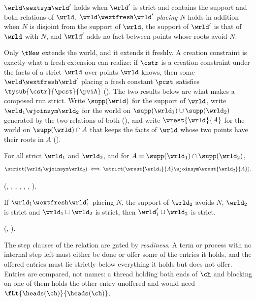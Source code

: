\begin{definition}
\label{def:wext}
  $\wrld \wextsym \wrld'$ holds when $\wrld'$ is strict and contains the
  support and both relations of $\wrld$.
  $\wrld \wextfresh \wrld'$ \emph{placing $N$} holds in addition when
  $N$ is disjoint from the support of $\wrld$, the support of $\wrld'$
  is that of $\wrld$ with $N$, and $\wrld'$ adds no fact between points
  whose roots avoid $N$.
\end{definition}

Only $\tNew$ extends the world, and it extends it freshly. A creation
constraint is exactly what a fresh extension can realize: if $\cstr$ is a
creation constraint under the facts of a strict $\wrld$ over points
$\wrld$ knows, then some $\wrld \wextfresh \wrld'$ placing a fresh
constant $\pcst$ satisfies $\tysub{\cstr}{\pcst}{\pviA}$
(). The two
results below are what makes a composed run strict. Write
$\supp(\wrld)$ for the support of $\wrld$, write
$\wrld_1 \wjoinsym \wrld_2$ for the world on
$\supp(\wrld_1) \cup \supp(\wrld_2)$ generated by the two relations of
both (), and write $\wrest{\wrld}{A}$ for the world on
$\supp(\wrld) \cap A$ that keeps the facts of $\wrld$ whose two points
have their roots in $A$ ().

\begin{theorem}
\label{thm:amalgamation}
  For all strict $\wrld_1$ and $\wrld_2$, and for
  $A = \supp(\wrld_1) \cap \supp(\wrld_2)$,
  \[
    \strict(\wrld_1 \wjoinsym \wrld_2)
    \iff
    \strict(\wrest{\wrld_1}{A} \wjoinsym \wrest{\wrld_2}{A}) .
  \]
\end{theorem}

(, , , ,
, , ).

\begin{theorem}
\label{thm:fresh-extension}
  If $\wrld_1 \wextfresh \wrld_1'$ placing $N$, the support of
  $\wrld_2$ avoids $N$, $\wrld_2$ is strict and
  $\wrld_1 \sqcup \wrld_2$ is strict, then
  $\wrld_1' \sqcup \wrld_2$ is strict.
\end{theorem}

(, ).

The step clauses of the relation are gated by \emph{readiness}. A term
or process with no internal step left must either be done or offer some
of the entries it holds, and the offered entries must lie strictly below
everything it holds but does not offer. Entries are compared, not names:
a thread holding both ends of $\ch$ and blocking on one of them holds
the other entry unoffered and would need
$\fLt{\heads(\ch)}{\heads(\ch)}$.

